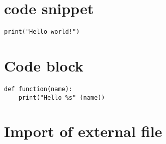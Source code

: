 \documentclass[11pt]{article}
\begin{document}
\section*{code snippet}
\lstinline[backgroundcolor=\color{lightgray}]$print("Hello world!")$

\section*{Code block}
\begin{lstlisting}[frame=single]
def function(name):
	print("Hello %s" (name))
\end{lstlisting}


\section*{Import of external file}

\end{document}
